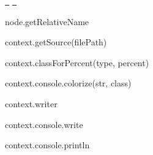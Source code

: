 \href{https://greenkeeper.io/}{\texttt{ }} \href{https://travis-ci.org/istanbuljs/istanbul-reports}{\texttt{ }}


\begin{DoxyItemize}
\item node.\+get\+Relative\+Name
\item context.\+get\+Source(file\+Path)
\item context.\+class\+For\+Percent(type, percent)
\item context.\+console.\+colorize(str, class)
\item context.\+writer
\item context.\+console.\+write
\item context.\+console.\+println 
\end{DoxyItemize}
